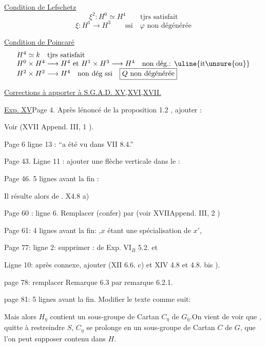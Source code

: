 \uline{Condition de Lefschetz}
\[
\xi^2:H^0\simeq H^4\qquad\text{tjrs satisfait}
\]
\[
\xi:H^1\longrightarrow H^3\qquad\text{ssi}\quad
\boxed{\varphi\text{ non dégénérée}}
\]

\uline{Condition de Poincaré}
\[
\begin{array}{l}
H^4\simeq k\quad\text{tjrs satisfait}\\
H^0\times H^4\longrightarrow H^4\text{ et }H^1\times H^3\longrightarrow H^4\quad\text{non dég.: }\uline{\text{it\unsure{ou}}}\\
H^2\times H^2\longrightarrow H^4\quad\text{non dég ssi}\quad\boxed{Q\text{ non dégénérée}}
\end{array}
\]

\uline{Corrections à apporter à S.G.A.D. XV,XVI,XVII.}

\uline{Exp. XV}\quad Page 4. Après lénoncé de la proposition 1.2 , ajouter :

Voir (XVII Append. III, 1 ).

Page 6 ligne 13 : ``a été vu dans  VII 8.4.''

Page 43. Ligne 11 : ajouter une flèche verticale dans le :

Page 46. 5 lignes avant la fin :

Il résulte alors de . X\inserted{,}4.8\inserted{(} a)

Page 60 : ligne 6. Remplacer (confer\hspace{2em}) par (voir XVII\inserted{,}Append. III, 2 )

Page 61: 4 lignes avant la fin: ,$x$ étant une spécialisation de $x'$, 

Page 77: ligne 2: supprimer : de Exp. VI$_B$ 5.2. et

Ligne 10: après connexe, ajouter (XII 6.6. c) et XIV 4.8 et 4.8. bis ).

page 78: remplacer Remarque 6.3 par remarque 6.2.1.

page 81: 5 lignes avant la fin. Modifier le texte comme suit:

Mais alors $H_\eta$ contient un sous-groupe de Cartan $C_\eta$ de $G_\eta$.On vient de voir que , quitte à restreindre $S$, $C_\eta$ se prolonge en un sous-groupe de Cartan $C$ de $G$, que l'on peut supposer contenu dans $H$.

